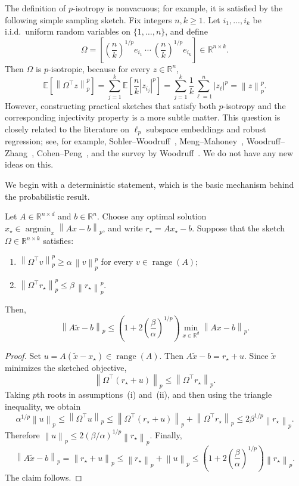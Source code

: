 \documentclass[onefignum,onetabnum]{siamart251216}
\newcommand{\R}{\mathbb{R}}
\newcommand{\E}{\mathbb{E}}
\newcommand{\norm}[1]{\left\lVert #1 \right\rVert}
\newcommand{\range}{\operatorname{range}}
\newcommand{\argmin}{\operatorname*{argmin}}
\begin{document}
The definition of $p$-isotropy is nonvacuous; for example, it is satisfied by the following simple sampling sketch. Fix integers $n,k\ge1$. Let $i_1,\dots,i_k$ be i.i.d.\ uniform random variables on $\{1,\dots,n\}$, and define
\[
\Omega
=
\left[
\left(\frac{n}{k}\right)^{1/p} e_{i_1}\ \cdots\ \left(\frac{n}{k}\right)^{1/p} e_{i_k}
\right]
\in \R^{n\times k}.
\]
Then $\Omega$ is $p$-isotropic, because for every $z\in\R^n$,
\[
\E\!\left[\norm{\Omega^\top z}_p^p\right]
=
\sum_{j=1}^k \E\!\left[\frac{n}{k}|z_{i_j}|^p\right]
=
\sum_{j=1}^k \frac{1}{k}\sum_{\ell=1}^n |z_\ell|^p
=
\norm{z}_p^p.
\]
However, constructing practical sketches that satisfy both $p$-isotropy and the corresponding injectivity property is a more subtle matter. This question is closely related to the literature on $\ell_p$ subspace embeddings and robust regression; see, for example, Sohler--Woodruff~\cite{SohlerWoodruff2011}, Meng--Mahoney~\cite{MengMahoney2013}, Woodruff--Zhang~\cite{WoodruffZhang2013}, Cohen--Peng~\cite{CohenPeng2015}, and the survey by Woodruff~\cite{Woodruff2014}.  We do not have any new ideas on this.

We begin with a deterministic statement, which is the basic mechanism behind the probabilistic result. 

\begin{theorem}\label{thm:deterministic-lp}
Let $A\in\R^{n\times d}$ and $b\in\R^n$.  Choose any optimal solution $x_\star\in\argmin_x \norm{Ax-b}_p$, and write $r_\star = Ax_\star-b$. Suppose that the sketch $\Omega\in\R^{n\times k}$ satisfies:
\begin{enumerate}[label=(\roman*),leftmargin=1.8em]
    \item $\norm{\Omega^\top v}_p^p \ge \alpha\,\norm{v}_p^p$ for every $v\in\range(A)$;
    \item $\norm{\Omega^\top r_\star}_p^p \le \beta\,\norm{r_\star}_p^p$.
\end{enumerate}
Then, 
\[
\norm{A\widetilde x-b}_p \le \left(1 + 2\left(\frac{\beta}{\alpha}\right)^{1/p}\right)\min_{x\in\R^d} \norm{Ax-b}_p.
\]
\end{theorem}

\begin{proof}
Set $u=A(\widetilde x-x_\star)\in\range(A)$. Then
$
A\widetilde x-b = r_\star + u.
$
Since $\widetilde x$ minimizes the sketched objective,
\[
\norm{\Omega^\top(r_\star+u)}_p \le \norm{\Omega^\top r_\star}_p.
\]
Taking $p$th roots in assumptions~(i) and~(ii), and then using the triangle inequality, we obtain
\[
\alpha^{1/p}\norm{u}_p
\le \norm{\Omega^\top u}_p
\le \norm{\Omega^\top(r_\star+u)}_p + \norm{\Omega^\top r_\star}_p
\le 2\beta^{1/p}\norm{r_\star}_p.
\]
Therefore
$
\norm{u}_p \le 2\left(\beta/\alpha\right)^{1/p}\norm{r_\star}_p.
$
Finally,
\[
\norm{A\widetilde x-b}_p
= \norm{r_\star+u}_p
\le \norm{r_\star}_p + \norm{u}_p
\le \left(1 + 2\left(\frac{\beta}{\alpha}\right)^{1/p}\right)\norm{r_\star}_p.
\]
The claim follows.
\end{proof}
\end{document}
